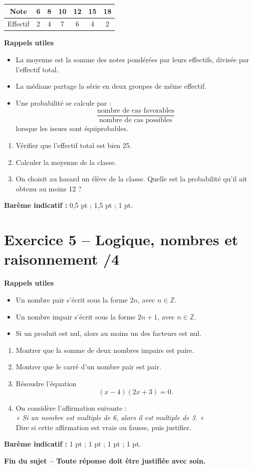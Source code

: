 \documentclass[11pt,a4paper]{article}
\begin{document}
\begin{center}
\begin{tabular}{|c|c|c|c|c|c|c|}
\hline
Note & 6 & 8 & 10 & 12 & 15 & 18 \\
\hline
Effectif & 2 & 4 & 7 & 6 & 4 & 2 \\
\hline
\end{tabular}
\end{center}

\textbf{Rappels utiles}
\begin{itemize}[leftmargin=1.2cm]
    \item La moyenne est la somme des notes pondérées par leurs effectifs, divisée par l’effectif total.
    \item La médiane partage la série en deux groupes de même effectif.
    \item Une probabilité se calcule par :
    \[
    \frac{\text{nombre de cas favorables}}{\text{nombre de cas possibles}}
    \]
    lorsque les issues sont équiprobables.
\end{itemize}

\begin{enumerate}
    \item Vérifier que l’effectif total est bien 25.
    \item Calculer la moyenne de la classe.
    \item On choisit au hasard un élève de la classe. Quelle est la probabilité qu’il ait obtenu au moins 12 ?
\end{enumerate}

\textbf{Barème indicatif :} 0,5 pt ; 1,5 pt ; 1 pt.

\section*{Exercice 5 -- Logique, nombres et raisonnement \hfill /4}

\textbf{Rappels utiles}
\begin{itemize}[leftmargin=1.2cm]
    \item Un nombre pair s’écrit sous la forme \(2n\), avec \(n\in\mathbb{Z}\).
    \item Un nombre impair s’écrit sous la forme \(2n+1\), avec \(n\in\mathbb{Z}\).
    \item Si un produit est nul, alors au moins un des facteurs est nul.
\end{itemize}

\begin{enumerate}
    \item Montrer que la somme de deux nombres impairs est paire.
    \item Montrer que le carré d’un nombre pair est pair.
    \item Résoudre l’équation
    \[
    (x-4)(2x+3)=0.
    \]
    \item On considère l’affirmation suivante :\\
    \emph{« Si un nombre est multiple de 6, alors il est multiple de 3. »}\\
    Dire si cette affirmation est vraie ou fausse, puis justifier.
\end{enumerate}

\textbf{Barème indicatif :} 1 pt ; 1 pt ; 1 pt ; 1 pt.

\vspace{0.5cm}

\begin{center}
\textbf{Fin du sujet -- Toute réponse doit être justifiée avec soin.}
\end{center}
\end{document}
